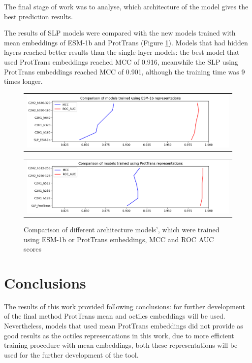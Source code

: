 \documentclass[12pt]{article}
\begin{document}
	The final stage of work was to analyse, which architecture of the
	model gives the best prediction results.

	The results of SLP models were compared with the new models 
	trained with mean embeddings of ESM-1b and ProtTrans (Figure 
	\ref{figure:scoresMLP_ESMandPT}). Models that had 
	hidden layers reached better results than the single-layer 
	models: the best model that used ProtTrans embeddings reached
	MCC of 0.916, meanwhile the SLP using ProtTrans embeddings 
	reached MCC of 0.901, although the training time was 9 times 
	longer.

	\begin{figure}[h!]
		\centering
		\begin{tabular}{@{}c@{}}
			\includegraphics[scale=0.6]{MLP_ESM.png}
		\end{tabular}

		\begin{tabular}{@{}c@{}}
			\includegraphics[scale=0.6]{MLP_PT.png}
		\end{tabular}
		
		\caption{Comparison of different architecture models', which were trained using 
		ESM-1b or ProtTrans embeddings, MCC and ROC AUC scores}
		\label{figure:scoresMLP_ESMandPT}
	\end{figure}

	\newpage

	\section{Conclusions}

	The results of this work provided following conclusions: for 
	further development of the final method ProtTrans mean and 
	octiles embeddings will be used. Nevertheless, models that used 
	mean ProtTrans embeddings did not provide as good results as 
	the octiles representations in this work, due to more efficient 
	training 
	procedure with mean embeddings, both these representations will 
	be used for the further development of the tool.
	
\end{document}
